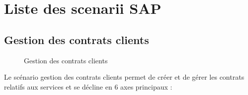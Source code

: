 \section{Liste des scenarii SAP}

\subsection{Gestion des contrats clients}

\begin{figure}[H]
    \label{fig-gestion-contrats-client}
    \noindent{}
    \caption{Gestion des contrats clients}
\end{figure}

Le scénario gestion des contrats clients permet de créer et de gérer les contrats relatifs aux services et se décline en 6 axes principaux : \\

